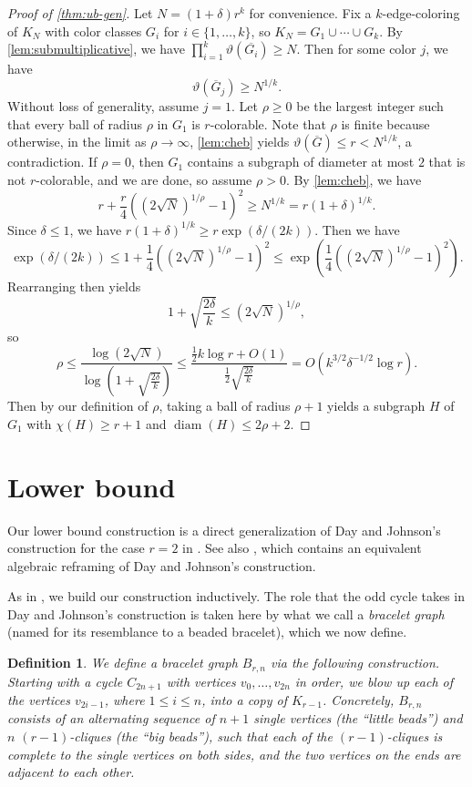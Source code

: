 \documentclass[10pt,a4paper]{amsart}
\newtheorem{definition}[theorem]{Definition}
\numberwithin{theorem}{section}
\renewcommand{\le}{\leqslant}
\renewcommand{\ge}{\geqslant}
\newcommand{\diam}{\operatorname{diam}}
\newcommand{\ov}[1]{\overline{#1}}
\begin{document}
\begin{proof}[Proof of \cref{thm:ub-gen}]
Let $N=(1+\delta)r^k$ for convenience. Fix a $k$-edge-coloring of $K_N$ with color classes $G_i$ for $i\in \{1,\dots,k\}$, so $K_N=G_1\cup\cdots\cup G_k$. By \cref{lem:submultiplicative}, we have $\prod_{i=1}^k\vartheta(\ov{G_i})\ge N$. Then for some color $j$, we have
\[
\vartheta(\ov G_j)\ge N^{1/k}.
\]
Without loss of generality, assume $j=1$. Let $\rho\ge 0$ be the largest integer such that every ball of radius $\rho$ in $G_1$ is $r$-colorable. Note that $\rho$ is finite because otherwise, in the limit as $\rho\to \infty$, \cref{lem:cheb} yields $\vartheta(\ov G)\le r<N^{1/k}$, a contradiction. If $\rho=0$, then $G_1$ contains a subgraph of diameter at most $2$ that is not $r$-colorable, and we are done, so assume $\rho>0$. By \cref{lem:cheb}, we have
\[
r+\frac{r}{4}((2\sqrt{N})^{1/\rho}-1)^2 \ge N^{1/k}=r(1+\delta)^{1/k}.
\]
Since $\delta \le 1$, we have $r(1+\delta)^{1/k}\ge r \exp(\delta/(2k))$. Then we have
\[
\exp(\delta/(2k))\le 1+\frac{1}{4}((2\sqrt{N})^{1/\rho}-1)^2\le \exp(\frac{1}{4}((2\sqrt{N})^{1/\rho}-1)^2).
\]
Rearranging then yields
\[
1+\sqrt{\frac{2\delta}{k}}\le (2\sqrt{N})^{1/\rho},
\]
so
\[
\rho \le \frac{\log (2\sqrt{N})}{\log (1+\sqrt{\frac{2\delta}{k}})}\le \frac{\frac{1}{2} k\log r+O(1)}{\frac{1}{2}\sqrt{\frac{2\delta}{k}}}=O(k^{3/2}\delta^{-1/2}\log r).
\]
Then by our definition of $\rho$, taking a ball of radius $\rho+1$ yields a subgraph $H$ of $G_1$ with $\chi(H)\ge r+1$ and  $\diam(H)\le 2\rho+2$.
\end{proof}

\section{Lower bound}
\label{sec:lb}

Our lower bound construction is a direct generalization of Day and Johnson's construction for the case $r=2$ in
\cite{DayJohnson2017MulticolourRamseyOddCycles}. See also \cite{zhu2025}, which contains an equivalent algebraic reframing of Day and Johnson's construction.

As in \cite{DayJohnson2017MulticolourRamseyOddCycles}, we build our construction inductively. The role that the odd cycle takes in Day and Johnson's construction is taken here by what we call a \emph{bracelet graph} (named for its resemblance to a beaded bracelet), which we now define.

\begin{definition}
    We define a \emph{bracelet graph} $B_{r,n}$ via the following construction. Starting with a cycle $C_{2n+1}$ with vertices $v_0,\dots,v_{2n}$ in order, we blow up each of the vertices $v_{2i-1}$, where $1\le i\le n$, into a copy of $K_{r-1}$. Concretely, $B_{r,n}$ consists of an alternating sequence of $n+1$ single vertices (the ``little beads'') and $n$ $(r-1)$-cliques (the ``big beads''), such that each of the $(r-1)$-cliques is complete to the single vertices on both sides, and the two vertices on the ends are adjacent to each other.
\end{definition}
\end{document}
